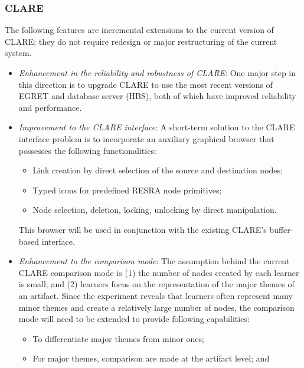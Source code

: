 \subsubsection{CLARE}

The following features are incremental extensions to the current version of
CLARE; they do not require redesign or major restructuring of the current
system. 

\begin{itemize}
\item {\it Enhancement in the reliability and robustness of CLARE}: One
  major step in this direction is to upgrade CLARE to use the most recent
  versions of EGRET and database server (HBS), both of which have
  improved reliability and performance.
  
\item {\it Improvement to the CLARE interface}: A short-term solution to
  the CLARE interface problem is to incorporate an auxiliary graphical
  browser that possesses the following functionalities:

  \begin{itemize}
  \item Link creation by direct selection of the source and destination
    nodes;
    
  \item Typed icons for predefined RESRA node primitives;
    
  \item Node selection, deletion, locking, unlocking by direct
    manipulation.
  \end{itemize}
  
  This browser will be used in conjunction with the existing
  CLARE's buffer-based interface.
  
\item {\it Enhancement to the comparison mode}: The assumption behind the
  current CLARE comparison mode is (1) the number of nodes created by each
  learner is small; and (2) learners focus on the representation of the
  major themes of an artifact. Since the experiment reveals that learners
  often represent many minor themes and create a relatively large number
  of nodes, the comparison mode will need to be extended to provide
  following capabilities:

  \begin{itemize}
  \item To differentiate major themes from minor ones;
    
  \item For major themes, comparison are made at the
    artifact level; and
    

\end{itemize}
\end{itemize}
